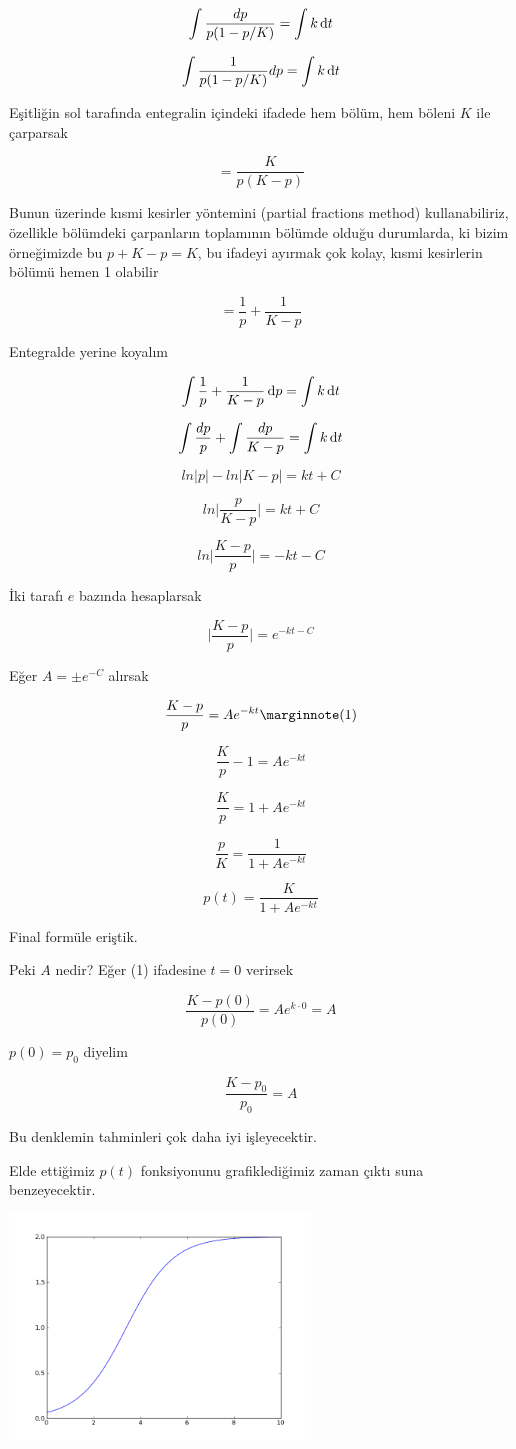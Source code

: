 \documentclass[12pt,fleqn]{article}\usepackage{../../common}
\begin{document}
$$ \int \frac{dp}{p(1-p/K)}  = \int k \,\mathrm{d} t$$

$$ \int \frac{1}{p(1-p/K)}dp  = \int k \,\mathrm{d} t$$

Eşitliğin sol tarafında entegralin içindeki ifadede hem bölüm, hem böleni
$K$ ile çarparsak

$$ = \frac{K}{p(K-p)} $$

Bunun üzerinde kısmi kesirler yöntemini (partial fractions method)
kullanabiliriz, özellikle bölümdeki çarpanların toplamının bölümde olduğu
durumlarda, ki bizim örneğimizde bu $p + K - p = K$, bu ifadeyi ayırmak çok
kolay, kısmi kesirlerin bölümü hemen 1 olabilir

$$ = \frac{1}{p}  + \frac{1}{K-p}$$

Entegralde yerine koyalım

$$ \int \frac{1}{p}  + \frac{1}{K-p} \,\mathrm{d} p  = \int k \,\mathrm{d} t$$


$$ \int \frac{dp}{p} + \int \frac{dp}{K-p} = \int k \,\mathrm{d} t $$

$$ ln|p| - ln|K-p| = kt + C $$

$$ ln \bigg| \frac{p}{K-p}\bigg|  = kt + C$$

$$ ln \bigg| \frac{K-p}{p}\bigg|  = -kt - C$$

İki tarafı $e$ bazında hesaplarsak

$$ \bigg| \frac{K-p}{p}\bigg| = e^{-kt - C} $$

Eğer $A = \pm e^{-C}$ alırsak

$$ \frac{K-p}{p} = A e^{-kt }  
\mlabel{1}
$$

$$ \frac{K}{p} - 1 = Ae^{-kt} $$

$$ \frac{K}{p}  = 1 + Ae^{-kt} $$

$$ \frac{p}{K}  = \frac{1}{ 1 + Ae^{-kt}}$$

$$ p(t) = \frac{K}{ 1 + Ae^{-kt}} $$

Final formüle eriştik. 

Peki $A$ nedir? Eğer (1) ifadesine $t=0$ verirsek

$$ \frac{K-p(0)}{p(0)} = A e^{k \cdot 0} = A$$

$p(0) = p_0$ diyelim

$$  \frac{K-p_0}{p_0} = A $$     

Bu denklemin tahminleri çok daha iyi işleyecektir. 

Elde ettiğimiz $p(t)$ fonksiyonunu grafiklediğimiz zaman çıktı suna
benzeyecektir. 

\includegraphics[height=6cm]{hill.png}
\end{document}
